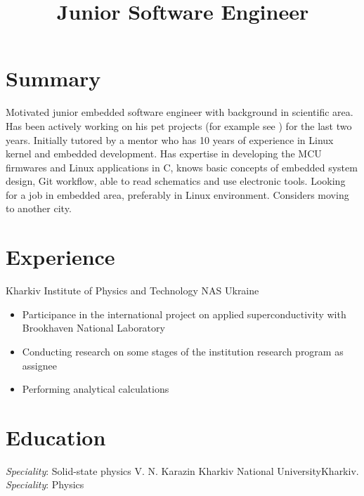 \documentclass[11pt,a4paper]{moderncv}
\title{Junior Software Engineer}
\begin{document}
\renewcommand*{\bibliographyhead}[1]{}

\maketitle

\section{Summary}

Motivated junior embedded software engineer with background in scientific area.
Has been actively working on his pet projects (for example see \cite{a, b}) for the
last two years. Initially tutored by a mentor who has 10 years of experience in
Linux kernel and embedded development. Has expertise in developing the MCU
firmwares and Linux applications in C, knows basic concepts of embedded system
design, Git workflow, able to read schematics and use electronic tools. Looking
for a job in embedded area, preferably in Linux environment.
Considers moving to another city.


\section{Experience}
   {Kharkiv Institute of Physics and Technology NAS Ukraine}
   {\begin{itemize}
     \item Participance in the international project on applied superconductivity with \newline{}
           Brookhaven National Laboratory
     \item Conducting research on some stages of the institution research program as \newline{}
           assignee
     \item Performing analytical calculations
   \end{itemize}}

\section{Education}
  {\textit{Speciality}: Solid-state physics}
  {V. N. Karazin Kharkiv National University}{Kharkiv.}{}
  {\textit{Speciality}: Physics}
\end{document}
